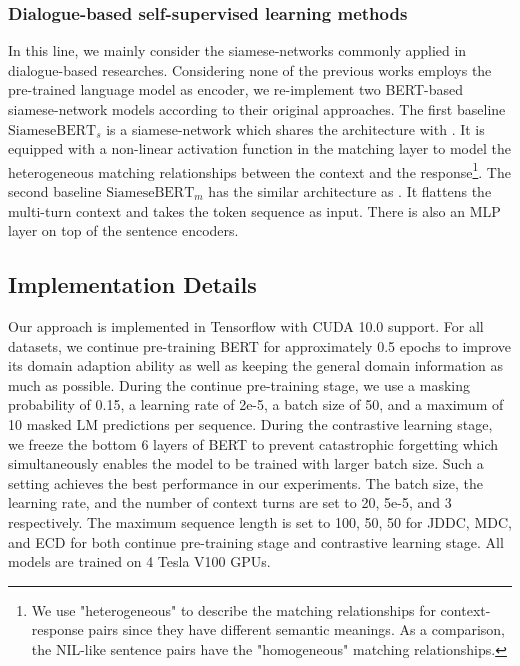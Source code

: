 \documentclass[11pt]{article}
\begin{document}
\subsubsection{\textbf{Dialogue-based self-supervised learning methods}}
In this line, we mainly consider the siamese-networks commonly applied in dialogue-based researches.
Considering none of the previous works \cite{co_dan, convert} employs the pre-trained language model as encoder, we re-implement two BERT-based siamese-network models according to their original approaches.
The first baseline $\text{SiameseBERT}_{s}$ is a siamese-network which shares the architecture with \cite{co_dan, sent_bert}.
It is equipped with a non-linear activation function in the matching layer to model the heterogeneous matching relationships between the context and the response\footnote{We use "heterogeneous" to describe the matching relationships for context-response pairs since they have different semantic meanings. As a comparison, the NIL-like sentence pairs have the "homogeneous" matching relationships.}.
The second baseline $\text{SiameseBERT}_{m}$ has the similar architecture as \cite{convert}.
It flattens the multi-turn context and takes the token sequence as input.
There is also an MLP layer on top of the sentence encoders.

\subsection{Implementation Details}
Our approach is implemented in Tensorflow \cite{abadi2016tensorflow} with CUDA 10.0 support.
For all datasets, we continue pre-training BERT for approximately 0.5 epochs to improve its domain adaption ability as well as keeping the general domain information as much as possible.
During the continue pre-training stage, we use a masking probability of 0.15, a learning rate of 2e-5, a batch size of 50, and a maximum of 10 masked LM predictions per sequence.
During the contrastive learning stage, we freeze the bottom 6 layers of BERT to prevent catastrophic forgetting which simultaneously enables the model to be trained with larger batch size.
Such a setting achieves the best performance in our experiments.
The batch size, the learning rate, and the number of context turns are set to 20, 5e-5, and 3 respectively.
The maximum sequence length is set to 100, 50, 50 for JDDC, MDC, and ECD for both continue pre-training stage and contrastive learning stage.
All models are trained on 4 Tesla V100 GPUs.
\end{document}
